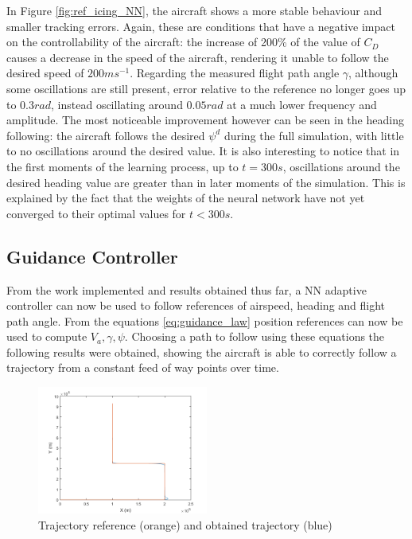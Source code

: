 In Figure \ref{fig:ref_icing_NN}, the aircraft shows a more stable behaviour and smaller tracking errors. Again, these are conditions that have a negative impact on the controllability of the aircraft: the increase of 200\% of the value of $C_D$ causes a decrease in the speed of the aircraft, rendering it unable to follow the desired speed of $200ms^{-1}$. Regarding the measured flight path angle $\gamma$, although  some oscillations are still present, error relative to the reference no longer goes up to $0.3 rad$, instead oscillating around $0.05rad$ at a much lower frequency and amplitude. The most noticeable improvement however can be seen in the heading following: the aircraft follows the desired $\psi^d$ during the full simulation, with little to no oscillations around the desired value. It is also interesting to notice that in the first moments of the learning process, up to $t=300s$, oscillations around the desired heading value are greater than in later moments of the simulation. This is explained by the fact that the weights of the neural network have not yet converged to their optimal values for $t<300s$.

\subsection{Guidance Controller}
\label{section:results/guidance_control}

From the work implemented and results obtained thus far, a NN adaptive controller can now be used to follow references of airspeed, heading and flight path angle. From the equations \ref{eq:guidance_law} position references can now be used to compute $V_a,\gamma, \psi$. Choosing a path to follow using these equations the following results were obtained, showing the aircraft is able to correctly follow a trajectory from a constant feed of way points over time.

\begin{figure}[h]
\centering
\includegraphics[width=0.5\textwidth]{../Figures/Results/guidance.png}
\caption[Trajectory following with guidance controller]{Trajectory reference (orange) and obtained trajectory (blue)}
\label{fig:guidance}
\end{figure}



